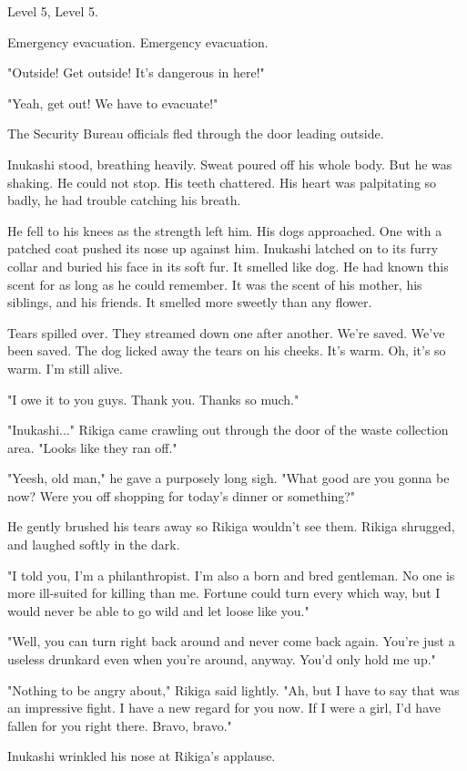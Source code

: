 Level 5, Level 5.

Emergency evacuation. Emergency evacuation.

"Outside! Get outside! It's dangerous in here!"

"Yeah, get out! We have to evacuate!"

The Security Bureau officials fled through the door leading outside.

Inukashi stood, breathing heavily. Sweat poured off his whole body. But
he was shaking. He could not stop. His teeth chattered. His heart was
palpitating so badly, he had trouble catching his breath.

He fell to his knees as the strength left him. His dogs approached. One
with a patched coat pushed its nose up against him. Inukashi latched on
to its furry collar and buried his face in its soft fur. It smelled like
dog. He had known this scent for as long as he could remember. It was
the scent of his mother, his siblings, and his friends. It smelled more
sweetly than any flower.

Tears spilled over. They streamed down one after another. We're saved.
We've been saved. The dog licked away the tears on his cheeks. It's
warm. Oh, it's so warm. I'm still alive.

"I owe it to you guys. Thank you. Thanks so much."

"Inukashi..." Rikiga came crawling out through the door of the waste
collection area. "Looks like they ran off."

"Yeesh, old man," he gave a purposely long sigh. "What good are you
gonna be now? Were you off shopping for today's dinner or something?"

He gently brushed his tears away so Rikiga wouldn't see them. Rikiga
shrugged, and laughed softly in the dark.

"I told you, I'm a philanthropist. I'm also a born and bred gentleman.
No one is more ill-suited for killing than me. Fortune could turn every
which way, but I would never be able to go wild and let loose like you."

"Well, you can turn right back around and never come back again. You're
just a useless drunkard even when you're around, anyway. You'd only hold
me up."

"Nothing to be angry about," Rikiga said lightly. "Ah, but I have to say
that was an impressive fight. I have a new regard for you now. If I were
a girl, I'd have fallen for you right there. Bravo, bravo."

Inukashi wrinkled his nose at Rikiga's applause.

